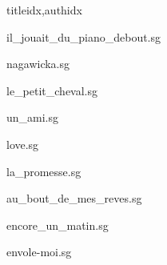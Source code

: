 \documentclass[
    ]{article}
\begin{document}
\begin{songs}{titleidx,authidx}

{il_jouait_du_piano_debout.sg}


{nagawicka.sg}


{le_petit_cheval.sg}


{un_ami.sg}


{love.sg}


{la_promesse.sg}


{au_bout_de_mes_reves.sg}


{encore_un_matin.sg}


{envole-moi.sg}


\end{songs}
\end{document}
